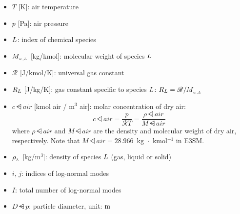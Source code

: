 \begin{itemize}
  \item $T$ [K]: air temperature

  \item $p$ [Pa]: air pressure

  \item $L$: index of chemical species

  \item $M_{_{w,L}}$ [kg/kmol]: molecular weight of species $L$

  \item $\mathscr{R}$ [J/kmol/K]: universal gas constant

  \item $R_{L}$ [J/kg/K]: gas constant specific to species $L$:
        $R_{L} = \mathscr{R}/M_{_{w,L}}$

  \item $c\dsub{air}$ [kmol air / m$^3$ air]: molar concentration of dry air:
    \begin{equation}
      c\dsub{air} = \frac{p}{\mathscr{R}T} = \frac{\rho\dsub{air}}{M\dsub{air}}
    \end{equation}
    where $\rho\dsub{air}$ and $M\dsub{air}$ are the density and molecular weight
    of dry air, respectively. Note that
    $M\dsub{air} = 28.966$~kg~$\cdot$~kmol$^{-1}$ in E3SM.

  \item $\rho_{_{L}}$ [kg/m$^3$]: density of species $L$
        (gas, liquid or solid)

  \item $i$, $j$: indices of log-normal modes

  \item $I$: total number of log-normal modes

  \item $D\dsub{p}$: particle diameter, unit: $\rm m$


\end{itemize}
